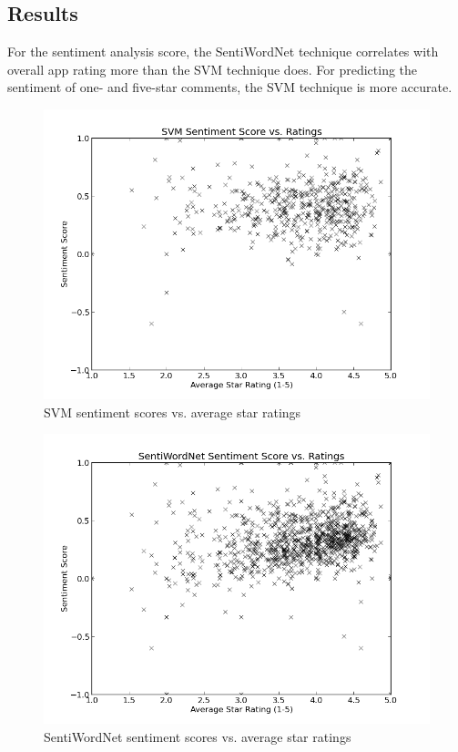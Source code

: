 \documentclass{acm_proc_article-sp}
\begin{document}
\subsection{Results}
For the sentiment analysis score, the SentiWordNet technique correlates with overall app rating more than the SVM technique does.  For predicting the sentiment of one- and five-star comments, the SVM technique is more accurate.

\begin{figure}[!h]
\centering
\includegraphics[scale=0.4]{svm.png}
\caption{SVM sentiment scores vs. average star ratings}
\label{fig:myfig1}
\end{figure}

\begin{figure}[!h]
\centering
\includegraphics[scale=0.4]{swn.png}
\caption{SentiWordNet sentiment scores vs. average star ratings}
\label{fig:myfig2}
\end{figure}
\end{document}
